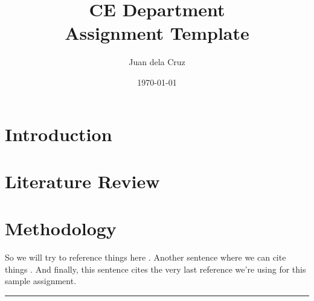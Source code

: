 \documentclass[DIV=calc]{scrartcl}
\title{CE Department\\Assignment Template}
\author{Juan dela Cruz}
\date{\today}
\begin{document}
\begin{spacing}{1}
	\maketitle
\end{spacing}




\section{Introduction}
\lipsum[1-2]
\section{Literature Review}
\lipsum[1-2]
\section{Methodology}
\lipsum[1-2]

So we will try to reference things here \autocite{ref_1}. Another sentence where we can cite things \autocite{ref_2}. And finally, this sentence cites the very last reference we're using for this sample assignment.


\vspace*{3em}
\hrule
\printbibliography
\end{document}
